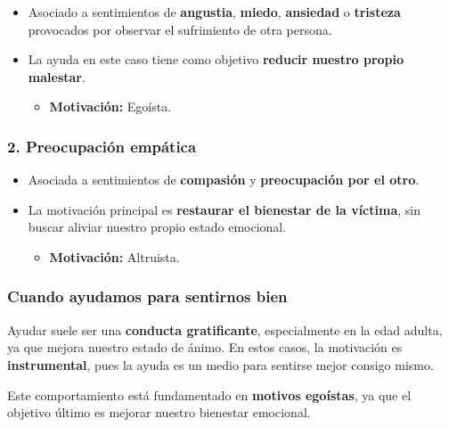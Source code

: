 \documentclass[
]{book}
\providecommand{\tightlist}{%
  \setlength{\itemsep}{0pt}\setlength{\parskip}{0pt}}
\begin{document}
\begin{itemize}
\tightlist
\item
  Asociado a sentimientos de \textbf{angustia}, \textbf{miedo}, \textbf{ansiedad} o \textbf{tristeza} provocados por observar el sufrimiento de otra persona.\\
\item
  La ayuda en este caso tiene como objetivo \textbf{reducir nuestro propio malestar}.

  \begin{itemize}
  \tightlist
  \item
    \textbf{Motivación:} Egoísta.
  \end{itemize}
\end{itemize}

\subsubsection{\texorpdfstring{2. \textbf{Preocupación empática}}{2. Preocupación empática}}\label{preocupaciuxf3n-empuxe1tica}

\begin{itemize}
\tightlist
\item
  Asociada a sentimientos de \textbf{compasión} y \textbf{preocupación por el otro}.\\
\item
  La motivación principal es \textbf{restaurar el bienestar de la víctima}, sin buscar aliviar nuestro propio estado emocional.

  \begin{itemize}
  \tightlist
  \item
    \textbf{Motivación:} Altruista.
  \end{itemize}
\end{itemize}

\subsubsection{Cuando ayudamos para sentirnos bien}\label{cuando-ayudamos-para-sentirnos-bien}

Ayudar suele ser una \textbf{conducta gratificante}, especialmente en la edad adulta, ya que mejora nuestro estado de ánimo. En estos casos, la motivación es \textbf{instrumental}, pues la ayuda es un medio para sentirse mejor consigo mismo.

Este comportamiento está fundamentado en \textbf{motivos egoístas}, ya que el objetivo último es mejorar nuestro bienestar emocional.
\end{document}
